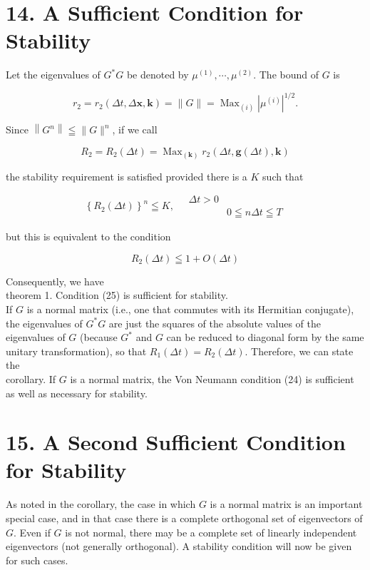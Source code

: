\documentclass[10pt]{article}
\begin{document}
\section*{14. A Sufficient Condition for Stability}
Let the eigenvalues of \(G^{*} G\) be denoted by \(\mu^{(1)}, \cdots, \mu^{(2)}\). The bound of \(G\) is

\[
r_{2}=r_{2}(\Delta t, \Delta \mathbf{x}, \mathbf{k})=\|G\|=\operatorname{Max}_{(i)}\left|\mu^{(i)}\right|^{1 / 2} .
\]

Since \(\left\|G^{n}\right\| \leqq\|G\|^{n}\), if we call

\[
R_{2}=R_{2}(\Delta t)=\operatorname{Max}_{(\mathbf{k})} r_{2}(\Delta t, \mathbf{g}(\Delta t), \mathbf{k})
\]

the stability requirement is satisfied provided there is a \(K\) such that

\[
\left\{R_{2}(\Delta t)\right\}^{n} \leqq K, \quad \begin{array}{ll}
\Delta t>0 \\
& 0 \leqq n \Delta t \leqq T
\end{array}
\]

but this is equivalent to the condition

\[
R_{2}(\Delta t) \leqq 1+O(\Delta t)
\]

Consequently, we have\\
theorem 1. Condition (25) is sufficient for stability.\\
If \(G\) is a normal matrix (i.e., one that commutes with its Hermitian conjugate), the eigenvalues of \(G^{*} G\) are just the squares of the absolute values of the eigenvalues of \(G\) (because \(G^{*}\) and \(G\) can be reduced to diagonal form by the same unitary transformation), so that \(R_{1}(\Delta t)=R_{2}(\Delta t)\). Therefore, we can state the\\
corollary. If \(G\) is a normal matrix, the Von Neumann condition (24) is sufficient as well as necessary for stability.

\section*{15. A Second Sufficient Condition for Stability}
As noted in the corollary, the case in which \(G\) is a normal matrix is an important special case, and in that case there is a complete orthogonal set of eigenvectors of \(G\). Even if \(G\) is not normal, there may be a complete set of linearly independent eigenvectors (not generally orthogonal). A stability condition will now be given for such cases.
\end{document}
